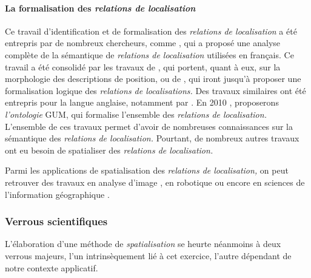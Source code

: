 \paragraph{La formalisation des \emph{relations de localisation}}

Ce travail d'identification et de formalisation des \emph{relations de
  localisation} a été entrepris par de nombreux chercheurs, comme
\textcite{Vandeloise1986}, qui a proposé une analyse complète de la
sémantique de \emph{relations de localisation} utilisées en
français. Ce travail a été consolidé par les travaux de
\textcite{Borillo1998}, qui portent, quant à eux, sur la morphologie
des descriptions de position, ou de \textcite{Aurnague1993,
  Aurnague1997}, qui iront jusqu'à proposer une formalisation logique
des \emph{relations de localisations.} Des travaux similaires ont été
entrepris pour la langue anglaise, notamment par
\autocite{Kracht2002,Mark1999,Freksa2018,Carlson2005,Lang1991,Matsakis2010}.
En 2010 \textcite{Bateman2010}, proposerons \emph{l'ontologie} GUM,
qui formalise l'ensemble des \emph{relations de localisation.}
L'ensemble de ces travaux permet d'avoir de nombreuses connaissances
sur la sémantique des \emph{relations de localisation.} Pourtant, de
nombreux autres travaux ont eu besoin de spatialiser des
\emph{relations de localisation.}

Parmi les applications de spatialisation des \emph{relations de
  localisation,} on peut retrouver des travaux en analyse d'image
\autocite{Hudelot2008, Hudelot2008a,Bloch1996, Vanegas2011,
  Takemura2012}, en robotique \autocite{Skubic2004} ou encore en
sciences de l'information géographique
\autocite{Xu2007a,Xu2007,Xu2006,Wolter2018,Dittrich2015,Du2016,Hornsby2009,Mathet2000,Hall2015}.



\subsubsection{Verrous scientifiques}

L’élaboration d'une méthode de \emph{spatialisation} se heurte
néanmoins à deux verrous majeurs, l'un intrinsèquement lié à cet
exercice, l'autre dépendant de notre contexte applicatif.

